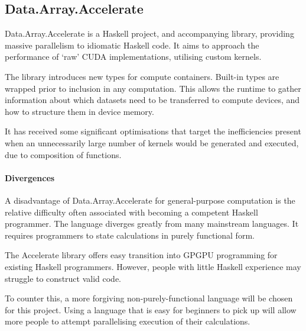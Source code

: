 \subsection{Data.Array.Accelerate}

Data.Array.Accelerate is a Haskell project\cite{daa}, and accompanying library\cite{daalib}, providing massive parallelism to idiomatic Haskell code. It aims to approach the performance of `raw' \ac{CUDA} implementations, utilising custom kernels.

The library introduces new types for compute containers. Built-in types are wrapped prior to inclusion in any computation. This allows the runtime to gather information about which datasets need to be transferred to compute devices, and how to structure them in device memory.

It has received some significant optimisations\cite{daaopt} that target the inefficiencies present when an unnecessarily large number of kernels would be generated and executed, due to composition of functions.

\paragraph*{Divergences}
A disadvantage of Data.Array.Accelerate for general-purpose computation is the relative difficulty often associated with becoming a competent Haskell programmer. The language diverges greatly from many mainstream languages.  It requires programmers to state calculations in purely functional form.

The Accelerate library offers easy transition into \ac{GPGPU} programming for existing Haskell programmers. However, people with little Haskell experience may struggle to construct valid code.

 To counter this, a more forgiving non-purely-functional language will be chosen for this project. Using a language that is easy for beginners to pick up will allow more people to attempt parallelising execution of their calculations.
